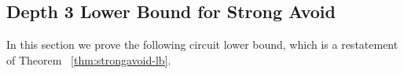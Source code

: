 \documentclass[11pt]{article}
\newcommand{\todo}[1]{\textcolor{red}{TODO: #1}}
\begin{document}

\subsection{Depth 3 Lower Bound for Strong Avoid}
\label{sec:depth3-lb}

In this section we prove the following circuit lower bound, which is a restatement of Theorem ~\ref{thm:strongavoid-lb}.
\end{document}
